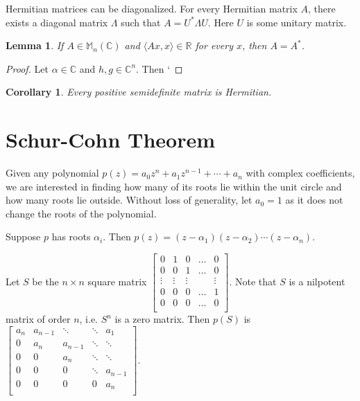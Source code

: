 \documentclass[twofold, twocolumn]{article}
\newcommand*\adj[1]{#1^*}
\theoremstyle{plain}
\newtheorem*{corollary}{Corollary}
\newtheorem*{lemma}{Lemma}
\theoremstyle{definition}
\begin{document}
Hermitian matrices can be diagonalized. For every Hermitian matrix \(A\), there exists a diagonal matrix \(\Lambda\) such that \(A = \adj{U}  \Lambda U\). Here \(U\) is some unitary matrix. 



\begin{lemma} If \(A \in \mathbb{M}_n (\mathbb{C})\) and \(\langle Ax, x \rangle \in \mathbb{R}\) for every \(x\), then \(A = \adj{A}\). \end{lemma}
\begin{proof} Let \(\alpha \in \mathbb{C}\) and \(h, g \in \mathbb{C}^n\). Then `\end{proof}

\begin{corollary}Every positive semidefinite matrix is Hermitian.\end{corollary}
\section{Schur-Cohn Theorem}

Given any polynomial \(p(z) = a_0 z^n + a_1z^{n-1} + \cdots + a_n\) with complex coefficients, we are interested in finding how many of its roots lie within the unit circle and how many roots lie outside. Without loss of generality, let \(a_0 = 1\) as it does not change the roots of the polynomial. 

Suppose \(p\) has roots \(\alpha_i\). Then \(p(z) = (z - \alpha_1) (z - \alpha_2) \cdots (z - \alpha_n)\). 


Let \(S\) be the \(n \times n\) square matrix \( \begin{bmatrix} 
0 & 1 & 0 & \ldots & 0 \\
0 & 0 & 1 & \ldots & 0 \\
\vdots & \vdots & \vdots & & \vdots \\
0 & 0 & 0 &\ldots & 1 \\
0 & 0 & 0 & \ldots & 0 \\ 
\end{bmatrix}\).  Note that \(S\) is a nilpotent matrix of order \(n\), i.e. \(S^n\) is a zero matrix. Then \(p(S) \) is \( \begin{bmatrix} 

a_n & a_{n-1} & \ddots & \ddots & a_1 \\
0 & a_n & a_{n-1} & \ddots & \ddots \\
0 & 0 & a_n & \ddots & \ddots \\
0 & 0 & 0 &\ddots & a_{n-1} \\
0 & 0 & 0 & 0 & a_n \\ 
\end{bmatrix}\). 
\end{document}
